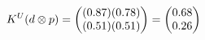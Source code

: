 \documentclass[preview]{standalone}
\begin{document}
\begin{align*}
\special{dvisvgm:raw <g id='unique000'>}K^U(d \otimes p) = \begin{pmatrix} (0.87)(0.78) \\ (0.51)(0.51) \end{pmatrix} = \begin{pmatrix} 0.68 \\ 0.26 \end{pmatrix}\special{dvisvgm:raw </g>}
\end{align*}
\end{document}
